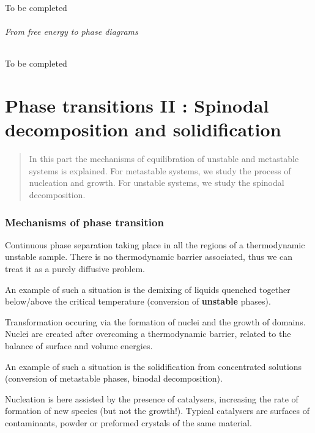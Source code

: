 \documentclass[../phys-f308.tex]{subfiles}
\begin{document}
    \color{red} To be completed\color{black}

    \paragraph{From free energy to phase diagrams}

    \color{red} To be completed\color{black}

    \part{Phase transitions II : Spinodal decomposition and solidification}

    \begin{abstract}
        In this part the mechanisms of equilibration of unstable and metastable systems is explained. For metastable systems, we study the process of nucleation and growth. For unstable systems, we study the spinodal decomposition.
    \end{abstract}

    \section{Mechanisms of phase transition}

    \begin{definition}
        Continuous phase separation taking place in all the regions of a thermodynamic unstable sample. There is no thermodynamic barrier associated, thus we can treat it as a purely diffusive problem.    
    \end{definition}
    An example of such a situation is the demixing of liquids quenched together below/above the critical temperature (conversion of \textbf{unstable} phases).

    \begin{definition}
        Transformation occuring via the formation of nuclei and the growth of domains. Nuclei are created after overcoming a thermodynamic barrier, related to the balance of surface and volume energies. 
    \end{definition}
    An example of such a situation is the solidification from concentrated solutions (conversion of metastable phases, binodal decomposition).

    \begin{definition}
        Nucleation is here assisted by the presence of catalysers, increasing the rate of formation of new species (but not the growth!). Typical catalysers are surfaces of contaminants, powder or preformed crystals of the same material.  
    \end{definition}
\end{document}
